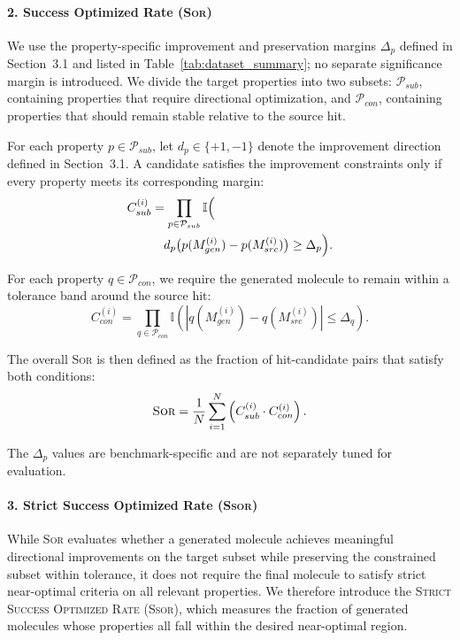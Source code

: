 \documentclass[11pt]{article}
\begin{document}
\paragraph{2. Success Optimized Rate (\textsc{Sor})}
We use the property-specific improvement and preservation margins $\Delta_p$ defined in Section~3.1 and listed in Table~\ref{tab:dataset_summary}; no separate significance margin is introduced. We divide the target properties into two subsets: $\mathcal{P}_{sub}$, containing properties that require directional optimization, and $\mathcal{P}_{con}$, containing properties that should remain stable relative to the source hit.



For each property $p \in \mathcal{P}_{sub}$, let $d_p \in \{+1,-1\}$ denote the improvement direction defined in Section~3.1. A candidate satisfies the improvement constraints only if every property meets its corresponding margin:
\[
    \begin{aligned}
    C_{sub}^{(i)} &= \prod_{p \in \mathcal{P}_{sub}} \mathbb{I}\Bigl( \\
    &\quad d_p \bigl(p(M_{gen}^{(i)}) - p(M_{src}^{(i)})\bigr) \geq \Delta_p \Bigr).
    \end{aligned}
\]

For each property $q \in \mathcal{P}_{con}$, we require the generated molecule to remain within a tolerance band around the source hit:
\[
    C_{con}^{(i)} = \prod_{q \in \mathcal{P}_{con}} \mathbb{I}\left( \left| q(M_{gen}^{(i)}) - q(M_{src}^{(i)}) \right| \le \Delta_q \right).
\]

The overall \textsc{Sor} is then defined as the fraction of hit-candidate pairs that satisfy both conditions:
\[
    \textsc{Sor} = \frac{1}{N} \sum_{i=1}^N \left( C_{sub}^{(i)} \cdot C_{con}^{(i)} \right).
\]

The $\Delta_p$ values are benchmark-specific and are not separately tuned for evaluation.



\paragraph{3. Strict Success Optimized Rate (\textsc{Ssor})}
While \textsc{Sor} evaluates whether a generated molecule achieves meaningful directional improvements on the target subset while preserving the constrained subset within tolerance, it does not require the final molecule to satisfy strict near-optimal criteria on all relevant properties. We therefore introduce the \textsc{Strict Success Optimized Rate} (\textsc{Ssor}), which measures the fraction of generated molecules whose properties all fall within the desired near-optimal region.
\end{document}
